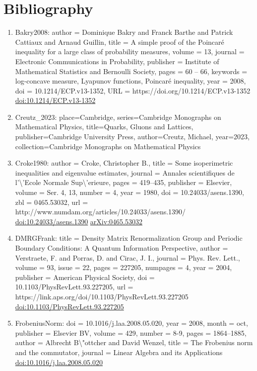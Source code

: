 \documentclass[11pt]{article}
\begin{document}
\section*{Bibliography}
\begin{enumerate}[leftmargin=*]
  \item Bakry2008: author = Dominique Bakry and Franck Barthe and Patrick Cattiaux and Arnaud Guillin, title = A simple proof of the Poincaré inequality for a large class of probability measures, volume = 13, journal = Electronic Communications in Probability, publisher = Institute of Mathematical Statistics and Bernoulli Society, pages = 60 -- 66, keywords = log-concave measure, Lyapunov functions, Poincaré inequality, year = 2008, doi = 10.1214/ECP.v13-1352, URL = https://doi.org/10.1214/ECP.v13-1352 \href{https://doi.org/10.1214/ECP.v13-1352}{doi:10.1214/ECP.v13-1352}
  \item Creutz\_2023: place=Cambridge, series=Cambridge Monographs on Mathematical Physics, title=Quarks, Gluons and Lattices, publisher=Cambridge University Press, author=Creutz, Michael, year=2023, collection=Cambridge Monographs on Mathematical Physics
  \item Croke1980: author = Croke, Christopher B., title = Some isoperimetric inequalities and eigenvalue estimates, journal = Annales scientifiques de l'\textbackslash{}'Ecole Normale Sup\textbackslash{}'erieure, pages = 419--435, publisher = Elsevier, volume = Ser. 4, 13, number = 4, year = 1980, doi = 10.24033/asens.1390, zbl = 0465.53032, url = http://www.numdam.org/articles/10.24033/asens.1390/ \href{https://doi.org/10.24033/asens.1390}{doi:10.24033/asens.1390} \href{https://arxiv.org/abs/0465.53032}{arXiv:0465.53032}
  \item DMRGFrank: title = Density Matrix Renormalization Group and Periodic Boundary Conditions: A Quantum Information Perspective, author = Verstraete, F. and Porras, D. and Cirac, J. I., journal = Phys. Rev. Lett., volume = 93, issue = 22, pages = 227205, numpages = 4, year = 2004, publisher = American Physical Society, doi = 10.1103/PhysRevLett.93.227205, url = https://link.aps.org/doi/10.1103/PhysRevLett.93.227205 \href{https://doi.org/10.1103/PhysRevLett.93.227205}{doi:10.1103/PhysRevLett.93.227205}
  \item FrobeniusNorm: doi = 10.1016/j.laa.2008.05.020, year = 2008, month = oct, publisher = Elsevier BV, volume = 429, number = 8-9, pages = 1864--1885, author = Albrecht B\textbackslash{}"ottcher and David Wenzel, title = The Frobenius norm and the commutator, journal = Linear Algebra and its Applications \href{https://doi.org/10.1016/j.laa.2008.05.020}{doi:10.1016/j.laa.2008.05.020}

\end{enumerate}
\end{document}
